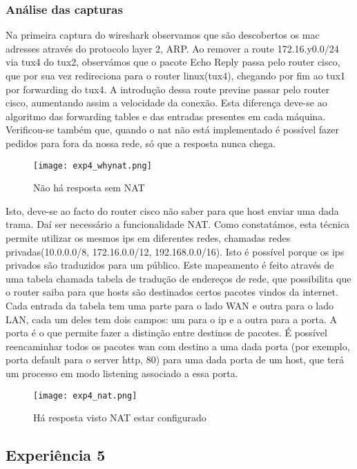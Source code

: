 \documentclass[a4paper]{article}
\begin{document}
\subsubsection{Análise das capturas}
Na primeira captura do wireshark observamos que são descobertos os mac adresses
através do protocolo layer 2, ARP. Ao remover a route 172.16.y0.0/24 via tux4
do tux2, observámos que o pacote Echo Reply passa pelo router cisco, que por
sua vez redireciona para o router linux(tux4), chegando por fim ao tux1 por
forwarding do tux4. A introdução dessa route previne passar pelo router cisco,
aumentando assim a velocidade da conexão. Esta diferença deve-se ao algoritmo
das forwarding tables e das entradas presentes em cada máquina. Verificou-se
também que, quando o nat não está implementado é possível fazer pedidos para
fora da nossa rede, só que a resposta nunca chega.

\begin{figure}[h]
    \centering
    \texttt{[image: exp4\_whynat.png]}
    \caption{Não há resposta sem NAT}
\end{figure}

Isto, deve-se ao facto do router cisco não saber para que host enviar uma dada
trama. Daí ser necessário a funcionalidade NAT. Como constatámos, esta técnica
permite utilizar os mesmos ips em diferentes redes, chamadas redes
privadas(10.0.0.0/8, 172.16.0.0/12, 192.168.0.0/16). Isto é possível porque os
ips privados são traduzidos para um público. Este mapeamento é feito através de
uma tabela chamada tabela de tradução de endereços de rede, que possibilita que
o router saiba para que hosts são destinados certos pacotes vindos da internet.
Cada entrada da tabela tem uma parte para o lado WAN e outra para o lado LAN,
cada um deles tem dois campos: um para o ip e a outra para a porta. A porta é o
que permite fazer a distinção entre destinos de pacotes. É possível
reencaminhar todos os pacotes wan com destino a uma dada porta (por exemplo,
porta default para o server http, 80) para uma dada porta de um host, que terá
um processo em modo listening associado a essa porta.

\begin{figure}[h]
    \centering
    \texttt{[image: exp4\_nat.png]}
    \caption{Há resposta visto NAT estar configurado}
\end{figure}

\subsection{Experiência 5}
\end{document}
